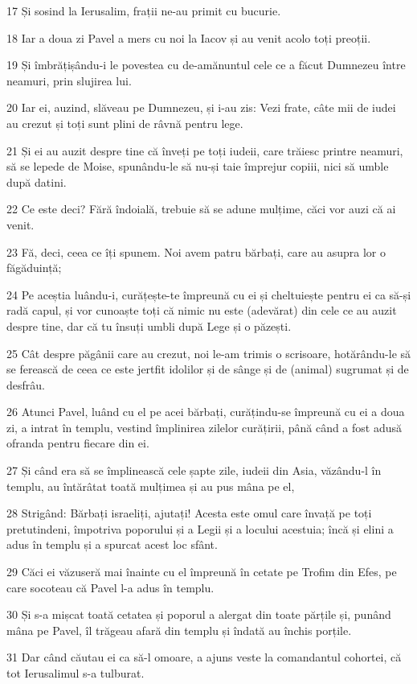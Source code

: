 \par 17 Și sosind la Ierusalim, frații ne-au primit cu bucurie.
\par 18 Iar a doua zi Pavel a mers cu noi la Iacov și au venit acolo toți preoții.
\par 19 Și îmbrățișându-i le povestea cu de-amănuntul cele ce a făcut Dumnezeu între neamuri, prin slujirea lui.
\par 20 Iar ei, auzind, slăveau pe Dumnezeu, și i-au zis: Vezi frate, câte mii de iudei au crezut și toți sunt plini de râvnă pentru lege.
\par 21 Și ei au auzit despre tine că înveți pe toți iudeii, care trăiesc printre neamuri, să se lepede de Moise, spunându-le să nu-și taie împrejur copiii, nici să umble după datini.
\par 22 Ce este deci? Fără îndoială, trebuie să se adune mulțime, căci vor auzi că ai venit.
\par 23 Fă, deci, ceea ce îți spunem. Noi avem patru bărbați, care au asupra lor o făgăduință;
\par 24 Pe aceștia luându-i, curățește-te împreună cu ei și cheltuiește pentru ei ca să-și radă capul, și vor cunoaște toți că nimic nu este (adevărat) din cele ce au auzit despre tine, dar că tu însuți umbli după Lege și o păzești.
\par 25 Cât despre păgânii care au crezut, noi le-am trimis o scrisoare, hotărându-le să se ferească de ceea ce este jertfit idolilor și de sânge și de (animal) sugrumat și de desfrâu.
\par 26 Atunci Pavel, luând cu el pe acei bărbați, curățindu-se împreună cu ei a doua zi, a intrat în templu, vestind împlinirea zilelor curățirii, până când a fost adusă ofranda pentru fiecare din ei.
\par 27 Și când era să se împlinească cele șapte zile, iudeii din Asia, văzându-l în templu, au întărâtat toată mulțimea și au pus mâna pe el,
\par 28 Strigând: Bărbați israeliți, ajutați! Acesta este omul care învață pe toți pretutindeni, împotriva poporului și a Legii și a locului acestuia; încă și elini a adus în templu și a spurcat acest loc sfânt.
\par 29 Căci ei văzuseră mai înainte cu el împreună în cetate pe Trofim din Efes, pe care socoteau că Pavel l-a adus în templu.
\par 30 Și s-a mișcat toată cetatea și poporul a alergat din toate părțile și, punând mâna pe Pavel, îl trăgeau afară din templu și îndată au închis porțile.
\par 31 Dar când căutau ei ca să-l omoare, a ajuns veste la comandantul cohortei, că tot Ierusalimul s-a tulburat.
